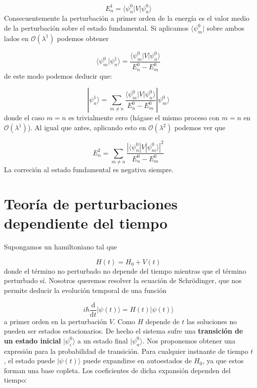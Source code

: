 \documentclass[12pt,a4paper]{book}
\numberwithin{equation}{chapter}
\numberwithin{figure}{chapter}
\newcommand{\D}{\mathrm{d}}
\newcommand{\derivadas}[2]{\frac{\D #1}{\D #2}}
\begin{document}
\begin{equation}
E_n^1 = \langle \psi_n^0 | V | \psi_n^0 \rangle
\end{equation}
Consecuentemente la perturbación a primer orden de la energía es el valor medio de la perturbación sobre el estado fundamental. Si aplicamos $\langle \psi_m^0 |$ sobre ambos lados en $\mathcal{O} (\lambda^1)$ podemos obtener 

\begin{equation}
\langle \psi_m^0 | \psi_n^1 \rangle = \frac{\langle \psi_m^0 | V |\psi_n^0 \rangle}{E_n^0 - E_m^0}
\end{equation}
de este modo podemos deducir que:

\begin{equation}
|\psi^1_n \rangle = \sum_{m\neq n }  \frac{\langle \psi_m^0 | V |\psi_n^0 \rangle}{E_n^0 - E_m^0} | \psi_m^0 \rangle
\end{equation}
donde el caso $m=n$ es trivialmente cero (hágase el mismo proceso con $m=n$ en $\mathcal{O}(\lambda^1)$). Al igual que antes, aplicando esto en $\mathcal{O}(\lambda^2)$ podemos ver que

\begin{equation}
E_n^2 = \sum_{m\neq n} \frac{|\langle \psi_n^0 | V | \psi_m^0\rangle |^2}{E_n^0 - E_m^0}
\end{equation}
La correción al estado fundamental es negativa siempre.

\section{Teoría de perturbaciones dependiente del tiempo}

Supongamos un hamiltoniano tal que

\begin{equation}
H (t) = H_0 + V(t) 
\end{equation}
donde el término no perturbado no depende del tiempo mientras que el término perturbado sí. Nosotros queremos resolver la ecuación de Schrödinger, que nos permite deducir la evolución temporal de una función

\begin{equation}
i \hbar \derivadas{}{t} | \psi(t) \rangle = H (t) | \psi (t)\rangle
\end{equation}
a primer orden en la perturbación $V$. Como $H$ depende de $t$ las soluciones no pueden ser estados estacionarios. De hecho el sistema sufre una \textbf{transición de un estado inicial} $|\psi_i^0\rangle$ a un estado final $|\psi_n^0 \rangle$. Nos proponemos obtener una expresión para la probabilidad de transición. Para cualquier instnante de tiempo $t$, el estado puede $|\psi(t)\rangle$ puede expandirse en autoestados de $H_0$, ya que estos forman una base copleta. Los coeficientes de dicha expansión dependen del tiempo:
\end{document}
